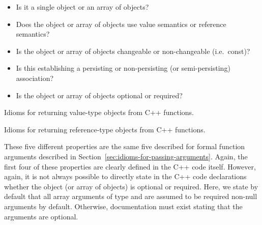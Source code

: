 \documentclass[pdf,ps2pdf,11pt]{SANDreport}
\begin{document}
\begin{itemize}

{}\item Is it a single object or an array of objects?

{}\item Does the object or array of objects use value semantics or
reference semantics?

{}\item Is the object or array of objects changeable or non-changeable
(i.e.\ const)?

{}\item Is this establishing a persisting or non-persisting (or
semi-persisting) association?

{}\item Is the object or array of objects optional or required?

\end{itemize}


\begin{table}
%
\begin{center}
%
%

%
%
%
\end{center}
\caption{\label{fig:func_return_value_type}
Idioms for returning value-type objects from C++ functions.}
%
\end{table}


\begin{table}
%
\begin{center}
%
%

%
%
%
\end{center}
\caption{\label{fig:func_return_reference_type}
Idioms for returning reference-type objects from C++ functions.}
%
\end{table}


These five different properties are the same five described for formal
function arguments described in
Section~\ref{sec:idioms-for-passing-arguments}.  Again, the first four
of these properties are clearly defined in the C++ code itself.
However, again, it is not always possible to directly state in the C++
code declarations whether the object (or array of objects) is optional
or required.  Here, we state by default that all array arguments of
type {} and {} are assumed to be required
non-null arguments by default.  Otherwise, documentation must exist
stating that the arguments are optional.
\end{document}
